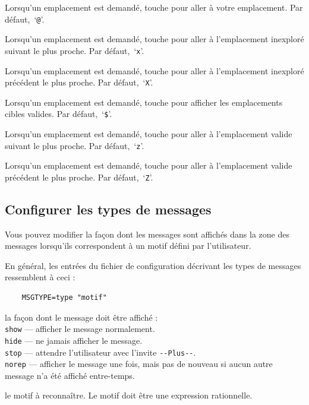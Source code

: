 \documentclass[titlepage]{article}
\begin{document}
\begin{description}[itemindent=10mm, labelwidth=15mm, rightmargin=15mm]
Lorsqu'un emplacement est demandé, touche pour aller à votre emplacement.
Par défaut,~`\texttt{@}'.
\item[getpos.unexplored.next]
Lorsqu'un emplacement est demandé, touche pour aller à l'emplacement inexploré suivant le plus proche.
Par défaut,~`\texttt{x}'.
\item[getpos.unexplored.prev]
Lorsqu'un emplacement est demandé, touche pour aller à l'emplacement inexploré
précédent le plus proche. Par défaut,~`\texttt{X}'.
\item[getpos.valid]
Lorsqu'un emplacement est demandé, touche pour afficher les emplacements cibles valides.
Par défaut,~`\texttt{\$}'.
\item[getpos.valid.next]
Lorsqu'un emplacement est demandé, touche pour aller à l'emplacement valide suivant le plus proche.
Par défaut,~`\texttt{z}'.
\item[getpos.valid.prev]
Lorsqu'un emplacement est demandé, touche pour aller à l'emplacement valide précédent le plus proche.
Par défaut,~`\texttt{Z}'.
\end{description}


\subsection*{Configurer les types de messages}

Vous pouvez modifier la façon dont les messages sont affichés dans la zone des
messages lorsqu'ils correspondent à un motif défini par l'utilisateur.

En général, les entrées du fichier de configuration décrivant les types de
messages ressemblent à ceci :
\begin{verbatim}
    MSGTYPE=type "motif"
\end{verbatim}
\begin{description}[font=\mdseries\itshape]
\item[type]
la façon dont le message doit être affiché :
\\
\texttt{show}  --- afficher le message normalement.\\
\texttt{hide}  --- ne jamais afficher le message.\\
\texttt{stop}  --- attendre l'utilisateur avec l'invite \texttt{-{}-Plus-{}-}.\\
\texttt{norep} --- afficher le message une fois, mais pas de nouveau si aucun autre message n'a été
affiché entre-temps.
\item[motif]
le motif à reconnaître. Le motif doit être une expression rationnelle.
\end{description}
\end{document}
